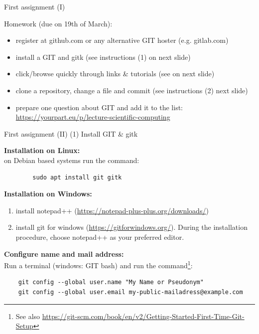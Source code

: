 \begin{frame}{First assignment (I)}

Homework (due on 19th of March):

\begin{itemize}
	\item register at github.com or any alternative GIT hoster (e.g. gitlab.com)
	\item install a GIT and gitk (see instructions (1) on next slide)
	\item click/browse quickly through links \& tutorials (see on next slide)
	\item clone a repository, change a file and commit (see instructions (2) next slide)
	\item prepare one question about GIT and add it to the list: \href{https://yourpart.eu/p/lecture-scientific-computing}{https://yourpart.eu/p/lecture-scientific-computing}

\end{itemize}


\end{frame}

\begin{frame}[fragile]{First assignment (II)}
	(1) Install GIT \& gitk

    {\bf Installation on Linux:}\\
    on Debian based systems run the command:

	\begin{verbatim}
	    sudo apt install git gitk
	\end{verbatim}

    {\bf Installation on Windows:}
    \begin{enumerate}
        \item install notepad++ (\href{https://notepad-plus-plus.org/downloads/}{https://notepad-plus-plus.org/downloads/})
        \item install git for windows
            (\href{https://gitforwindows.org/}{https://gitforwindows.org/}). During the
            installation procedure, choose notepad++ as your preferred editor.
    \end{enumerate}

    {\bf Configure name and mail address:}\\
    Run a terminal (windows: GIT bash) and run the command\footnote{
        See also
            \href{https://git-scm.com/book/en/v2/Getting-Started-First-Time-Git-Setup}
            {https://git-scm.com/book/en/v2/Getting-Started-First-Time-Git-Setup}
    }:
    {\small
        \begin{verbatim}
    git config --global user.name "My Name or Pseudonym"
    git config --global user.email my-public-mailadress@example.com
        \end{verbatim}
    }

\end{frame}

